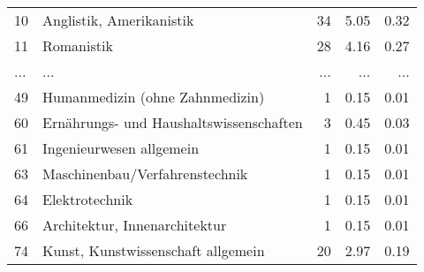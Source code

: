 \begin{longtable}{lXrrr}
        10 & \multicolumn{1}{X}{Anglistik, Amerikanistik} & %
          \num{34} &
          \num[round-mode=places,round-precision=2]{5,05} &
          \num[round-mode=places,round-precision=2]{0,32} \\
        11 & \multicolumn{1}{X}{Romanistik} & %
          \num{28} &
          \num[round-mode=places,round-precision=2]{4,16} &
          \num[round-mode=places,round-precision=2]{0,27} \\
       ... & ... & ... & ... & ... \\
        49 & \multicolumn{1}{X}{Humanmedizin (ohne Zahnmedizin)} & %
          \num{1} &
          \num[round-mode=places,round-precision=2]{0,15} &
          \num[round-mode=places,round-precision=2]{0,01} \\

        60 & \multicolumn{1}{X}{Ernährungs- und Haushaltswissenschaften} & %
          \num{3} &
          \num[round-mode=places,round-precision=2]{0,45} &
          \num[round-mode=places,round-precision=2]{0,03} \\

        61 & \multicolumn{1}{X}{Ingenieurwesen allgemein} & %
          \num{1} &
          \num[round-mode=places,round-precision=2]{0,15} &
          \num[round-mode=places,round-precision=2]{0,01} \\

        63 & \multicolumn{1}{X}{Maschinenbau/Verfahrenstechnik} & %
          \num{1} &
          \num[round-mode=places,round-precision=2]{0,15} &
          \num[round-mode=places,round-precision=2]{0,01} \\

        64 & \multicolumn{1}{X}{Elektrotechnik} & %
          \num{1} &
          \num[round-mode=places,round-precision=2]{0,15} &
          \num[round-mode=places,round-precision=2]{0,01} \\

        66 & \multicolumn{1}{X}{Architektur, Innenarchitektur} & %
          \num{1} &
          \num[round-mode=places,round-precision=2]{0,15} &
          \num[round-mode=places,round-precision=2]{0,01} \\

        74 & \multicolumn{1}{X}{Kunst, Kunstwissenschaft allgemein} & %
          \num{20} &
          \num[round-mode=places,round-precision=2]{2,97} &
          \num[round-mode=places,round-precision=2]{0,19} \\


\end{longtable}
